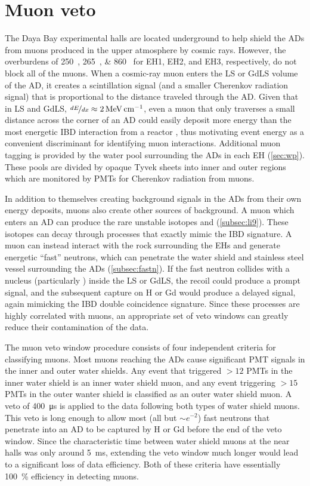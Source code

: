 \section{Muon veto}
\label{sec:muonveto}

The Daya Bay experimental halls are located underground
to help shield the ADs from muons produced in the upper atmosphere by cosmic rays.
However, the overburdens of \SIlist{250;265;860}{\mwe}
for EH1, EH2, and EH3, respectively, do not block all of the muons.
When a cosmic-ray muon enters the LS or GdLS volume of the AD,
it creates a scintillation signal (and a smaller Cherenkov radiation signal)
that is proportional to the distance traveled
through the AD.
Given that in LS and GdLS, $\nicefrac{dE}{dx} \approx \SI{2}{\mev\per\cm}$,
even a muon that only traverses a small distance across the corner of an AD could easily deposit
more energy than the most energetic IBD interaction from a reactor \nuebar,
thus motivating event energy as a convenient discriminant for identifying muon interactions.
Additional muon tagging is provided by the water pool
surrounding the ADs in each EH (\cref{sec:wp}).
These pools are divided by opaque Tyvek sheets into inner and outer regions
which are monitored by PMTs for Cherenkov radiation from muons.

In addition to themselves creating background signals in the ADs
from their own energy deposits,
muons also create other sources of background.
A muon which enters an AD can produce
the rare unstable isotopes \li{} and \he{} (\cref{subsec:li9}).
These isotopes can decay through processes that exactly mimic the IBD signature.
A muon can instead interact with the rock surrounding the EHs
and generate energetic ``fast'' neutrons,
which can penetrate the water shield and stainless steel vessel surrounding the ADs
(\cref{subsec:fastn}).
If the fast neutron collides with a nucleus (particularly )
inside the LS or GdLS,
the recoil could produce a prompt signal,
and the subsequent capture on H or Gd would produce
a delayed signal, again mimicking the IBD double coincidence signature.
Since these processes are highly correlated with muons,
an appropriate set of veto windows can greatly reduce their contamination of the data.

The muon veto window procedure consists of four independent criteria
for classifying muons.
Most muons reaching the ADs cause significant PMT signals in the inner and outer water shields.
Any event that triggered $>12$ PMTs in the inner water shield
is an inner water shield muon,
and any event triggering $>15$ PMTs in the outer wanter shield
is classified as an outer water shield muon.
A veto of \SI{400}{\micro\second} is applied to the data following
both types of water shield muons.
This veto is long enough to allow most (all but $\sim e^{-2}$)
fast neutrons that penetrate into an AD to be captured by H or Gd
before the end of the veto window.
Since the characteristic time between water shield muons at the near halls
was only around \SI{5}{\milli\second},
extending the veto window much longer would lead to a significant
loss of data efficiency.
Both of these criteria have essentially \SI{100}{\percent} efficiency
in detecting muons.

